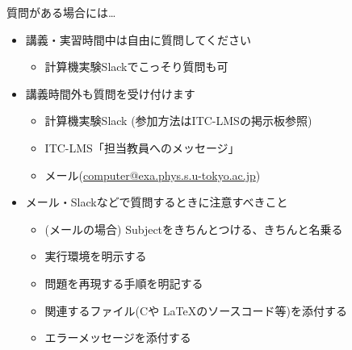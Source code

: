\begin{frame}[t]{質問がある場合には…}
  \begin{itemize}
  \item 講義・実習時間中は自由に質問してください
    \begin{itemize}
    \item 計算機実験Slackでこっそり質問も可
    \end{itemize}
  \item 講義時間外も質問を受け付けます
    \begin{itemize}
    \item 計算機実験Slack (参加方法はITC-LMSの掲示板参照)
    \item ITC-LMS「担当教員へのメッセージ」
    \item メール(\href{mailto:computer@exa.phys.s.u-tokyo.ac.jp}{computer@exa.phys.s.u-tokyo.ac.jp})
    \end{itemize}
  \item メール・Slackなどで質問するときに注意すべきこと
    \begin{itemize}
    \item (メールの場合) Subjectをきちんとつける、きちんと名乗る
    \item 実行環境を明示する
    \item 問題を再現する手順を明記する
    \item 関連するファイル(Cや \LaTeX のソースコード等)を添付する
    \item エラーメッセージを添付する
    \end{itemize}
  \end{itemize}
\end{frame}

  
